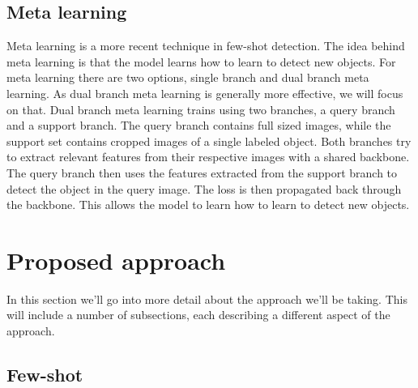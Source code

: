 \subsection{Meta learning}
Meta learning is a more recent technique in few-shot detection. The idea behind meta learning is that the model learns how to learn to detect new objects. For meta learning there are two options, single branch and dual branch meta learning. As dual branch meta learning is generally more effective, we will focus on that. Dual branch meta learning trains using two branches, a query branch and a support branch. The query branch contains full sized images, while the support set contains cropped images of a single labeled object. Both branches try to extract relevant features from their respective images with a shared backbone. The query branch then uses the features extracted from the support branch to detect the object in the query image. The loss is then propagated back through the backbone. This allows the model to learn how to learn to detect new objects.

\section{Proposed approach}
In this section we'll go into more detail about the approach we'll be taking.
This will include a number of subsections, each describing a different aspect of the approach.
\subsection{Few-shot}


